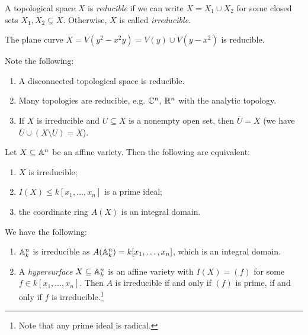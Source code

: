 \begin{definition}
  A topological space $X$ is \emph{reducible}
  if we can write $X = X_1 \cup X_2$
  for some closed sets $X_1, X_2 \subsetneq X$.
  Otherwise, $X$ is called \emph{irreducible}.
\end{definition}

\begin{example}
  The plane curve
  $X = V(y^2 - x^2y) = V(y) \cup V(y - x^2)$
  is reducible.
\end{example}

\begin{remark}
  Note the following:
  \begin{enumerate}
    \item A disconnected topological space
      is reducible.
    \item Many topologies are reducible,
      e.g. $\mathbb{C}^n$, $\mathbb{R}^n$ with the analytic
      topology.
    \item If $X$ is irreducible and
      $U \subseteq X$ is a nonempty open
      set, then $\overline{U} = X$ (we have
      $\overline{U} \cup (X \setminus U) = X$).
  \end{enumerate}
\end{remark}

\begin{prop}
  Let $X \subseteq \mathbb{A}^n$ be an
  affine variety. Then the following are equivalent:
  \begin{enumerate}
    \item $X$ is irreducible;
    \item $I(X) \le k[x_1, \dots, x_n]$
      is a prime ideal;
    \item the coordinate ring $A(X)$
      is an integral domain.
  \end{enumerate}
\end{prop}

\begin{example}
  We have the following:
  \begin{enumerate}
    \item $\mathbb{A}_k^n$ is irreducible
      as $A(\mathbb{A}_k^n) = k[x_1, \dots, x_n]$,
      which is an integral domain.
    \item A \emph{hypersurface}
      $X \subseteq \mathbb{A}_k^n$ is
      an affine variety with $I(X) = (f)$
      for some $f \in k[x_1, \dots, x_n]$.
      Then $A$ is irreducible if and only
      if $(f)$ is prime, if and only if
      $f$ is irreducible.\footnote{Note that any prime ideal is radical.}
  \end{enumerate}
\end{example}
